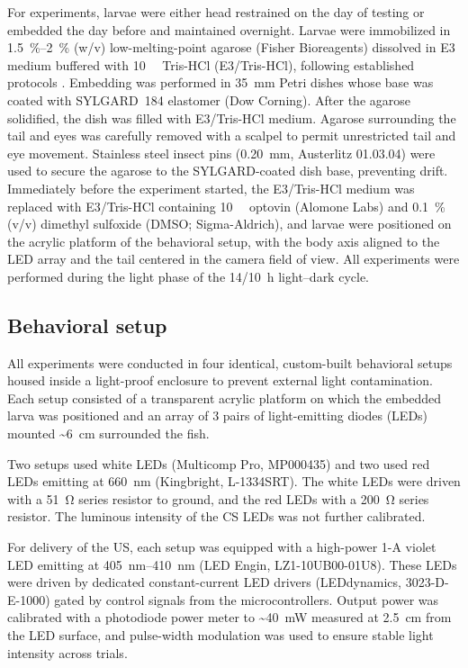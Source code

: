 For experiments, larvae were either head restrained on the day of testing or embedded the day before and maintained overnight. Larvae were immobilized in \SIrange{1.5}{2}{\percent} (w/v) low-melting-point agarose (Fisher Bioreagents) dissolved in E3 medium
buffered with \SI{10}{\milli\Molar} Tris-HCl (E3/Tris-HCl), following established protocols \citep{Portugues2011}. Embedding was performed in \SI{35}{\milli\meter} Petri dishes whose base was coated with SYLGARD\texttrademark~184 elastomer (Dow Corning). After the agarose solidified, the dish was filled with E3/Tris-HCl medium. Agarose surrounding the tail and eyes was carefully removed with a scalpel to permit unrestricted tail and eye movement. Stainless steel insect pins (0.20~mm, Austerlitz 01.03.04) were used to secure the agarose to the SYLGARD-coated dish base, preventing drift. Immediately before the experiment started, the E3/Tris-HCl medium was replaced with E3/Tris-HCl containing \SI{10}{\micro\Molar} optovin (Alomone Labs) and \SI{0.1}{\percent} (v/v) dimethyl sulfoxide (DMSO; Sigma-Aldrich), and larvae were positioned on the acrylic platform of the behavioral setup, with the body axis aligned to the LED array and the tail centered in the camera field of view. All experiments were performed during the light phase of the 14/10~h light--dark cycle.


\subsection{Behavioral setup}

All experiments were conducted in four identical, custom-built behavioral setups housed inside a light-proof enclosure to prevent external light contamination. Each setup consisted of a transparent acrylic platform on which the embedded larva was positioned and an array of 3 pairs of light-emitting diodes (LEDs) mounted \textasciitilde\SI{6}{\centi\meter} surrounded the fish.

Two setups used white LEDs (Multicomp Pro, MP000435) and two used red LEDs emitting at \SI{660}{\nano\meter} (Kingbright, L-1334SRT). The white LEDs were driven with a \SI{51}{\ohm} series resistor to ground, and the red LEDs with a \SI{200}{\ohm} series resistor. The luminous intensity of the CS LEDs was not further calibrated.

For delivery of the US, each setup was equipped with a high-power 1-A violet LED emitting at \SIrange{405}{410}{\nano\meter} (LED Engin, LZ1-10UB00-01U8). These LEDs were driven by dedicated constant-current LED drivers (LEDdynamics, 3023-D-E-1000) gated by control signals from the microcontrollers. Output power was calibrated with a photodiode power meter to \textasciitilde\SI{40}{\milli\watt} measured at \SI{2.5}{\centi\meter} from the LED surface, and pulse-width modulation was used to ensure stable light intensity across trials.

